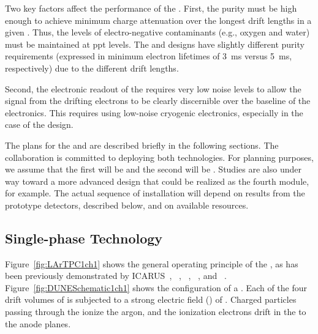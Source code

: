 Two key factors affect the performance of the  .  First, the  purity must be high enough to achieve minimum charge attenuation over the longest drift lengths in a given .  Thus, the levels of electro-negative contaminants (e.g., oxygen and water) must be maintained at ppt levels.  The  and  designs have slightly different purity requirements (expressed in minimum electron lifetimes of \SI{3}{ms} versus \SI{5}{ms}, respectively) due to the different drift lengths.

Second, the electronic readout of the  requires very low noise levels to allow the signal from the drifting electrons to be clearly discernible over the baseline of the electronics.  This requires using low-noise cryogenic electronics, especially in the case of the  design. 

The plans for the  and   are described briefly in the following sections. 
The  collaboration is committed to deploying both technologies.
For planning purposes, we assume that the first  will be
 and the second will be .
%
Studies are also under way toward a more advanced  design that could be realized as 
the fourth module, for example. 
%
The actual sequence of  installation will depend on results from the prototype detectors, described below, and on available resources.


\subsection{Single-phase Technology}
\label{sec:physics-intro-dunefd-splar}

Figure~\ref{fig:LArTPC1ch1} shows the general operating principle of the  , as has been previously demonstrated by ICARUS~\cite{Icarus-T600}, ~\cite{microboone}, ~\cite{Anderson:2012vc}, ~\cite{Cavanna:2014iqa}, and ~\cite{Abi:2017aow}. Figure~\ref{fig:DUNESchematic1ch1} shows the configuration of a  . Each of the four drift volumes of  is subjected to a strong electric field (\efield{}) of \spmaxfield. Charged particles passing through the  ionize the argon, and the ionization electrons drift in the \efield to the anode planes. 


